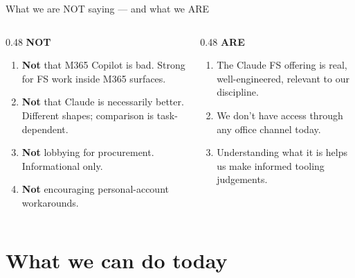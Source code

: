 \documentclass[11pt,aspectratio=169]{beamer}
\begin{document}
\begin{frame}{What we are NOT saying --- and what we ARE}
  \begin{columns}[T,onlytextwidth]
    \begin{column}{0.48\textwidth}
      \textbf{NOT} \medskip
      \footnotesize
      \begin{enumerate}
        \item \textbf{Not} that M365 Copilot is bad. Strong for FS work inside M365 surfaces.
        \item \textbf{Not} that Claude is necessarily better. Different shapes; comparison is task-dependent.
        \item \textbf{Not} lobbying for procurement. Informational only.
        \item \textbf{Not} encouraging personal-account workarounds.
      \end{enumerate}
    \end{column}
    \begin{column}{0.48\textwidth}
      \textbf{ARE} \medskip
      \footnotesize
      \begin{enumerate}
        \item The Claude FS offering is real, well-engineered, relevant to our discipline.
        \item We don't have access through any office channel today.
        \item Understanding what it is helps us make informed tooling judgements.
      \end{enumerate}
    \end{column}
  \end{columns}
\end{frame}

\section{What we can do today}
\end{document}
